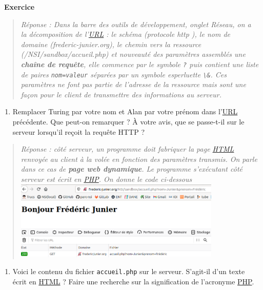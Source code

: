 \documentclass[
  11pt,
]{article}
\newcommand{\passthrough}[1]{#1}
\providecommand{\tightlist}{%
  \setlength{\itemsep}{0pt}\setlength{\parskip}{0pt}}
\newcounter{exo}
\newenvironment{exercice}[1]
{\par \medskip   \addtocounter{exo}{1} \noindent  
\begin{bclogo}[arrondi =0.1,   noborder = true, logo=\bccrayon, marge=4]{~\textbf{Exercice} \textbf{\theexo} {\itshape #1} }  \par}
{
\end{bclogo}
 \par \bigskip }
\newcounter{rque}
\newcounter{def}
\newcounter{prog}
\begin{document}
\begin{exercice}{}
\begin{quote}
\emph{Réponse : Dans la barre des outils de développement, onglet
Réseau, on a la décomposition de l'\url{URL} : le schéma (protocole http
), le nom de domaine (frederic-junier.org), le chemin vers la ressource
(/NSI/sandbox/accueil.php) et nouveauté des paramètres assemblés une
\textbf{chaîne de requête}, elle commence par le symbole
\passthrough{\lstinline!?!} puis contient une liste de paires
\passthrough{\lstinline!nom=valeur!} séparées par un symbole esperluette
\passthrough{\lstinline!\&!}. Ces paramètres ne font pas partie de
l'adresse de la ressource mais sont une façon pour le client de
transmettre des informations au serveur.}
\end{quote}

\begin{enumerate}
\def\labelenumi{\arabic{enumi}.}
\setcounter{enumi}{2}
\tightlist
\item
  Remplacer Turing par votre nom et Alan par votre prénom dans
  l'\href{https://developer.mozilla.org/fr/docs/Glossaire/URL}{URL}
  précédente. Que peut-on remarquer ? À votre avis, que se passe-t-il
  sur le serveur lorsqu'il reçoit la requête HTTP ?
\end{enumerate}

\begin{quote}
\emph{Réponse : côté serveur, un programme doit fabriquer la page
\url{HTML} renvoyée au client à la volée en fonction des paramètres
transmis. On parle dans ce cas de \textbf{page web dynamique}. Le
programme s'exécutant côté serveur est écrit en \url{PHP}. On donne le
code ci-dessous}
\includegraphics[width=0.8\textwidth,height=\textheight]{images/bonjour_frederic.png}\\
\end{quote}

\begin{enumerate}
\def\labelenumi{\arabic{enumi}.}
\setcounter{enumi}{3}
\tightlist
\item
  Voici le contenu du fichier \passthrough{\lstinline!accueil.php!} sur
  le serveur. S'agit-il d'un texte écrit en
  \href{https://developer.mozilla.org/fr/docs/Glossaire/HTML}{HTML} ?
  Faire une recherche sur la signification de l'acronyme
  \href{https://developer.mozilla.org/fr/docs/Glossaire/PHP}{PHP}.
\end{enumerate}


\end{exercice}
\end{document}
